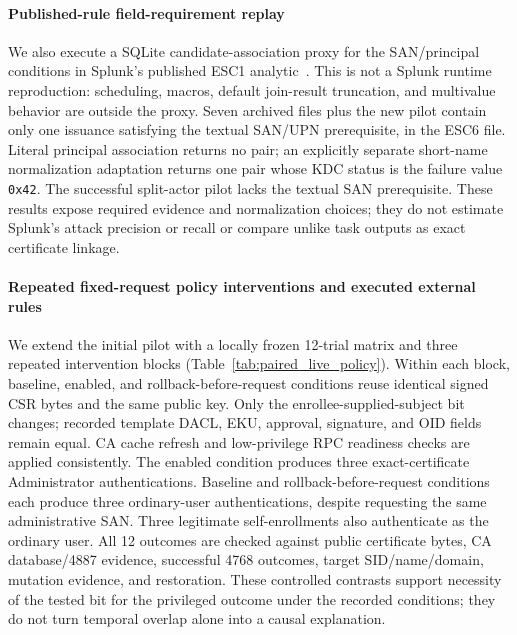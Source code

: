 \paragraph{Published-rule field-requirement replay}
We also execute a SQLite candidate-association proxy for the SAN/principal conditions in Splunk's published ESC1 analytic~\cite{splunk2026esc1}. This is not a Splunk runtime reproduction: scheduling, macros, default join-result truncation, and multivalue behavior are outside the proxy. Seven archived files plus the new pilot contain only one issuance satisfying the textual SAN/UPN prerequisite, in the ESC6 file. Literal principal association returns no pair; an explicitly separate short-name normalization adaptation returns one pair whose KDC status is the failure value \texttt{0x42}. The successful split-actor pilot lacks the textual SAN prerequisite. These results expose required evidence and normalization choices; they do not estimate Splunk's attack precision or recall or compare unlike task outputs as exact certificate linkage.



\paragraph{Repeated fixed-request policy interventions and executed external rules}
We extend the initial pilot with a locally frozen 12-trial matrix and three repeated intervention blocks (Table~\ref{tab:paired_live_policy}). Within each block, baseline, enabled, and rollback-before-request conditions reuse identical signed CSR bytes and the same public key. Only the enrollee-supplied-subject bit changes; recorded template DACL, EKU, approval, signature, and OID fields remain equal. CA cache refresh and low-privilege RPC readiness checks are applied consistently. The enabled condition produces three exact-certificate Administrator authentications. Baseline and rollback-before-request conditions each produce three ordinary-user authentications, despite requesting the same administrative SAN. Three legitimate self-enrollments also authenticate as the ordinary user. All 12 outcomes are checked against public certificate bytes, CA database/4887 evidence, successful 4768 outcomes, target SID/name/domain, mutation evidence, and restoration. These controlled contrasts support necessity of the tested bit for the privileged outcome under the recorded conditions; they do not turn temporal overlap alone into a causal explanation.

